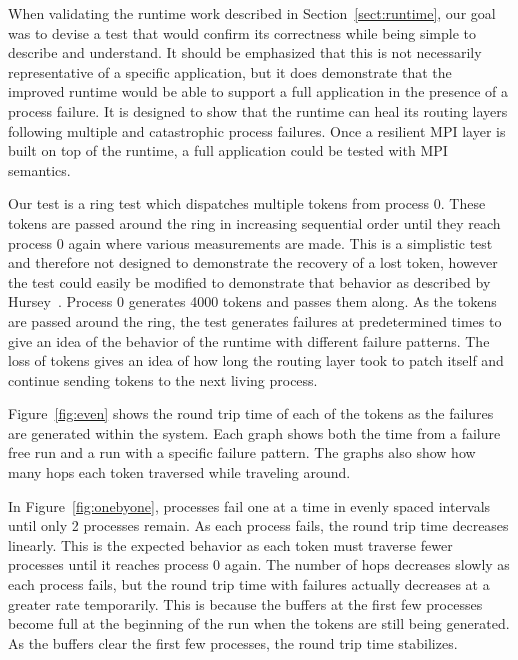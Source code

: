 When validating the runtime work described in Section~\ref{sect:runtime}, our
goal was to devise a test that would confirm its correctness while being simple
to describe and understand. It should be emphasized that this is not necessarily
representative of a specific application, but it does demonstrate that the
improved runtime would be able to support a full application in the presence of
a process failure. It is designed to show that the runtime can heal its routing
layers following multiple and catastrophic process failures. Once a resilient
MPI layer is built on top of the runtime, a full application could be tested
with MPI semantics.

Our test is a ring test which dispatches multiple tokens from process 0. These
tokens are passed around the ring in increasing sequential order until they
reach process 0 again where various measurements are made. This is a simplistic
test and therefore not designed to demonstrate the recovery of a lost token,
however the test could easily be modified to demonstrate that behavior as
described by Hursey~\cite{Hursey:vb}. Process 0 generates 4000 tokens and passes
them along. As the tokens are passed around the ring, the test generates
failures at predetermined times to give an idea of the behavior of the runtime
with different failure patterns. The loss of tokens gives an idea of how long
the routing layer took to patch itself and continue sending tokens to the next
living process.


Figure~\ref{fig:even} shows the round trip time of each of the tokens as the
failures are generated within the system. Each graph shows both the time from a
failure free run and a run with a specific failure pattern. The graphs also
show how many hops each token traversed while traveling around.


In Figure~\ref{fig:onebyone}, processes fail one at a time in evenly spaced
intervals until only 2 processes remain. As each process fails, the round trip
time decreases linearly. This is the expected behavior as each token must
traverse fewer processes until it reaches process 0 again. The number of hops
decreases slowly as each process fails, but the round trip time with failures
actually decreases at a greater rate temporarily. This is because the buffers at
the first few processes become full at the beginning of the run when the tokens
are still being generated. As the buffers clear the first few processes, the
round trip time stabilizes.%

